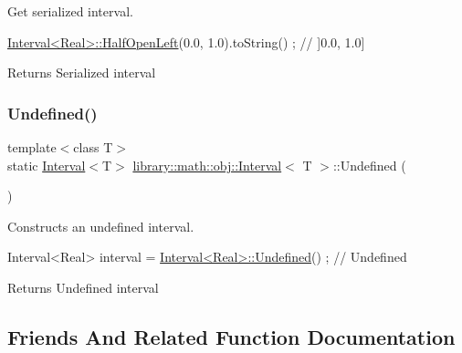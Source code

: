 Get serialized interval. 


\begin{DoxyCode}
\hyperlink{classlibrary_1_1math_1_1obj_1_1_interval_a7e706c1e5133c731645e7633a9d763bd}{Interval<Real>::HalfOpenLeft}(0.0, 1.0).toString() ; \textcolor{comment}{// ]0.0, 1.0]}
\end{DoxyCode}


\begin{DoxyReturn}{Returns}
Serialized interval 
\end{DoxyReturn}
\mbox{\label{classlibrary_1_1math_1_1obj_1_1_interval_a415849a8c5306d6811612a842a5d0a40}} 
\subsubsection{\texorpdfstring{Undefined()}{Undefined()}}
{\footnotesize\ttfamily template$<$class T$>$ \\
static \hyperlink{classlibrary_1_1math_1_1obj_1_1_interval}{Interval}$<$T$>$ \hyperlink{classlibrary_1_1math_1_1obj_1_1_interval}{library\+::math\+::obj\+::\+Interval}$<$ T $>$\+::Undefined (\begin{DoxyParamCaption}{ }\end{DoxyParamCaption})\hspace{0.3cm}{\ttfamily [static]}}



Constructs an undefined interval. 


\begin{DoxyCode}
Interval<Real> interval = \hyperlink{classlibrary_1_1math_1_1obj_1_1_interval_a415849a8c5306d6811612a842a5d0a40}{Interval<Real>::Undefined}() ; \textcolor{comment}{// Undefined}
\end{DoxyCode}


\begin{DoxyReturn}{Returns}
Undefined interval 
\end{DoxyReturn}


\subsection{Friends And Related Function Documentation}
\mbox{\label{classlibrary_1_1math_1_1obj_1_1_interval_a3aa32afa8cb5d85eeb45540b0bf5657b}} 

